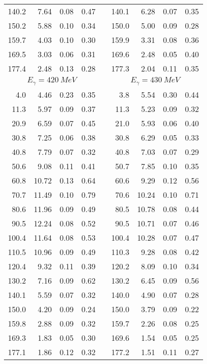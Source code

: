 \begin{table}[htbp]
\begin{center}
\begin{tabular}{|r|r|c|c|l|r|r|c|c|}
140.2 &  7.64 &  0.08 &  0.47 & & 140.1 &  6.28 &  0.07 &  0.35 \\ 
150.2 &  5.88 &  0.10 &  0.34 & & 150.0 &  5.00 &  0.09 &  0.28 \\ 
159.7 &  4.03 &  0.10 &  0.30 & & 159.9 &  3.31 &  0.08 &  0.36 \\ 
169.5 &  3.03 &  0.06 &  0.31 & & 169.6 &  2.48 &  0.05 &  0.40 \\ 
177.4 &  2.48 &  0.13 &  0.28 & & 177.3 &  2.04 &  0.11 &  0.35 \\ 
\hline 
\hline 
\multicolumn{4}{|c|}{ $E_{\gamma}=420~MeV$} & & 
\multicolumn{4}{c|}{ $E_{\gamma}=430~MeV$} \\ 
\cline{1-4} 
\cline{6-9} 
  4.0 &  4.46 &  0.23 &  0.35 & &   3.8 &  5.54 &  0.30 &  0.44 \\ 
 11.3 &  5.97 &  0.09 &  0.37 & &  11.3 &  5.23 &  0.09 &  0.32 \\ 
 20.9 &  6.59 &  0.07 &  0.45 & &  21.0 &  5.93 &  0.06 &  0.40 \\ 
 30.8 &  7.25 &  0.06 &  0.38 & &  30.8 &  6.29 &  0.05 &  0.33 \\ 
 40.8 &  7.79 &  0.07 &  0.32 & &  40.8 &  7.03 &  0.07 &  0.29 \\ 
 50.6 &  9.08 &  0.11 &  0.41 & &  50.7 &  7.85 &  0.10 &  0.35 \\ 
 60.8 & 10.72 &  0.13 &  0.64 & &  60.6 &  9.29 &  0.12 &  0.56 \\ 
 70.7 & 11.49 &  0.10 &  0.79 & &  70.6 & 10.24 &  0.10 &  0.71 \\ 
 80.6 & 11.96 &  0.09 &  0.49 & &  80.5 & 10.78 &  0.08 &  0.44 \\ 
 90.5 & 12.24 &  0.08 &  0.52 & &  90.5 & 10.71 &  0.07 &  0.46 \\ 
100.4 & 11.64 &  0.08 &  0.53 & & 100.4 & 10.28 &  0.07 &  0.47 \\ 
110.5 & 10.96 &  0.09 &  0.49 & & 110.3 &  9.28 &  0.08 &  0.42 \\ 
120.4 &  9.32 &  0.11 &  0.39 & & 120.2 &  8.09 &  0.10 &  0.34 \\ 
130.2 &  7.16 &  0.09 &  0.62 & & 130.2 &  6.45 &  0.09 &  0.56 \\ 
140.1 &  5.59 &  0.07 &  0.32 & & 140.0 &  4.90 &  0.07 &  0.28 \\ 
150.0 &  4.20 &  0.09 &  0.24 & & 150.0 &  3.79 &  0.09 &  0.22 \\ 
159.8 &  2.88 &  0.09 &  0.32 & & 159.7 &  2.26 &  0.08 &  0.25 \\ 
169.3 &  1.83 &  0.05 &  0.30 & & 169.6 &  1.54 &  0.05 &  0.25 \\ 
177.1 &  1.86 &  0.12 &  0.32 & & 177.2 &  1.51 &  0.11 &  0.27 \\ 
\cline{1-4} 
\cline{6-9} 
\end{tabular} 

\end{center} 
\end{table}
